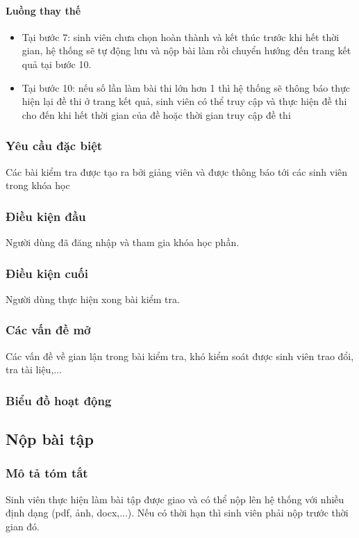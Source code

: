 \documentclass[./../main_file.tex]{subfiles}
\begin{document}
\paragraph{Luồng thay thế}
\begin{itemize}
	\item Tại bước 7: sinh viên chưa chọn hoàn thành và kết thúc trước khi hết thời gian, hệ thống sẽ tự động lưu và nộp bài làm rồi chuyển hướng đến trang kết quả tại bước 10.
	\item Tại bước 10: nếu số lần làm bài thi lớn hơn 1 thì hệ thống sẽ thông báo thực hiện lại đề thi ở trang kết quả, sinh viên có thể truy cập và thực hiện đề thi cho đến khi hết thời gian của đề hoặc thời gian truy cập đề thi
	
\end{itemize}
\subsubsection{Yêu cầu đặc biệt}
Các bài kiểm tra được tạo ra bởi giảng viên và được thông báo tới các sinh viên trong khóa học

\subsubsection{Điều kiện đầu}
Người dùng đã đăng nhập và tham gia khóa học phần.

\subsubsection{Điều kiện cuối}
Người dùng thực hiện xong bài kiểm tra.

\subsubsection{Các vấn đề mở}
Các vấn đề về gian lận trong bài kiểm tra, khó kiểm soát được sinh viên trao đổi, tra tài liệu,...

\subsubsection{Biểu đồ hoạt động}

\subsection{Nộp bài tập}
\subsubsection{Mô tả tóm tắt}
Sinh viên thực hiện làm bài tập được giao và có thể nộp lên hệ thống với nhiều định dạng (pdf, ảnh, docx,...). Nếu có thời hạn thì sinh viên phải nộp trước thời gian đó.
\end{document}

